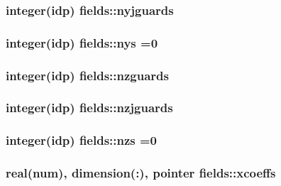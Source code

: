 \subsubsection[{\texorpdfstring{nyjguards}{nyjguards}}]{\setlength{\rightskip}{0pt plus 5cm}integer(idp) fields\+::nyjguards}\hypertarget{namespacefields_a040a1f8e7a331db1b9d025819a7e9453}{}\label{namespacefields_a040a1f8e7a331db1b9d025819a7e9453}
\subsubsection[{\texorpdfstring{nys}{nys}}]{\setlength{\rightskip}{0pt plus 5cm}integer(idp) fields\+::nys =0}\hypertarget{namespacefields_adc125104f8f7666c683e307ad9703412}{}\label{namespacefields_adc125104f8f7666c683e307ad9703412}
\subsubsection[{\texorpdfstring{nzguards}{nzguards}}]{\setlength{\rightskip}{0pt plus 5cm}integer(idp) fields\+::nzguards}\hypertarget{namespacefields_a08a746304a8f4b59076abee85eb82642}{}\label{namespacefields_a08a746304a8f4b59076abee85eb82642}
\subsubsection[{\texorpdfstring{nzjguards}{nzjguards}}]{\setlength{\rightskip}{0pt plus 5cm}integer(idp) fields\+::nzjguards}\hypertarget{namespacefields_ae8d3cd10ec1c6301ada4c9cad60c1125}{}\label{namespacefields_ae8d3cd10ec1c6301ada4c9cad60c1125}
\subsubsection[{\texorpdfstring{nzs}{nzs}}]{\setlength{\rightskip}{0pt plus 5cm}integer(idp) fields\+::nzs =0}\hypertarget{namespacefields_aa0a3c8b650acfd6add1cfe59383b4b0e}{}\label{namespacefields_aa0a3c8b650acfd6add1cfe59383b4b0e}
\subsubsection[{\texorpdfstring{xcoeffs}{xcoeffs}}]{\setlength{\rightskip}{0pt plus 5cm}real(num), dimension(\+:), pointer fields\+::xcoeffs}\hypertarget{namespacefields_af385d7c4d2f11c483c899d7f4aa8b3ca}{}\label{namespacefields_af385d7c4d2f11c483c899d7f4aa8b3ca}
